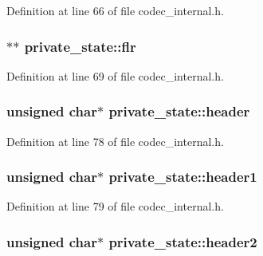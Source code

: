 Definition at line 66 of file codec\+\_\+internal.\+h.

\subsubsection[{\texorpdfstring{flr}{flr}}]{$\ast$$\ast$ private\+\_\+state\+::flr}\hypertarget{structprivate__state_a760c8e735e944bff53e1cddba407b128}{}\label{structprivate__state_a760c8e735e944bff53e1cddba407b128}


Definition at line 69 of file codec\+\_\+internal.\+h.

\subsubsection[{\texorpdfstring{header}{header}}]{\setlength{\rightskip}{0pt plus 5cm}unsigned char$\ast$ private\+\_\+state\+::header}\hypertarget{structprivate__state_aa013e7a0c879c920032aea499b4b9473}{}\label{structprivate__state_aa013e7a0c879c920032aea499b4b9473}


Definition at line 78 of file codec\+\_\+internal.\+h.

\subsubsection[{\texorpdfstring{header1}{header1}}]{\setlength{\rightskip}{0pt plus 5cm}unsigned char$\ast$ private\+\_\+state\+::header1}\hypertarget{structprivate__state_a39269dbce7d1ee96422dd1624df7ac4e}{}\label{structprivate__state_a39269dbce7d1ee96422dd1624df7ac4e}


Definition at line 79 of file codec\+\_\+internal.\+h.

\subsubsection[{\texorpdfstring{header2}{header2}}]{\setlength{\rightskip}{0pt plus 5cm}unsigned char$\ast$ private\+\_\+state\+::header2}\hypertarget{structprivate__state_a13f7fdfde42c329aa7d1c088592b3c66}{}\label{structprivate__state_a13f7fdfde42c329aa7d1c088592b3c66}


